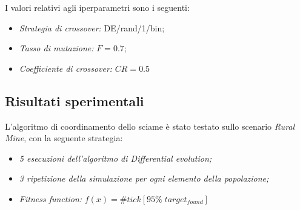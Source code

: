 I valori relativi agli iperparametri sono i seguenti:
\begin{itemize}
    \item \textit{Strategia di crossover:} DE/rand/1/bin;
    \item \textit{Tasso di mutazione:} $F=0.7$;
    \item \textit{Coefficiente di crossover:} $CR=0.5$
\end{itemize}

\subsection{Risultati sperimentali}

L'algoritmo di coordinamento dello sciame è stato testato sullo scenario \textit{Rural Mine}, con la seguente strategia:
\begin{itemize}
    \item \textit{5 esecuzioni dell'algoritmo di Differential evolution;}
    \item \textit{3 ripetizione della simulazione per ogni elemento della popolazione;}
    \item \textit{Fitness function:} $f(x) = \# tick[95 \% \; target_{found}]$
\end{itemize}

